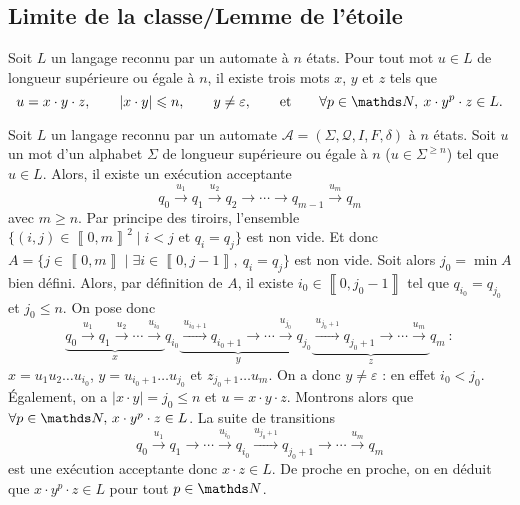 \subsection{Limite de la classe/Lemme de l'étoile}

\begin{thm}
	Soit $L$\/ un langage reconnu par un automate à $n$\/ états.
	Pour tout mot $u \in L$\/ de longueur supérieure ou égale à $n$, il existe trois mots $x$, $y$\/ et $z$\/ tels que \[
		u = x \cdot y \cdot z,\qquad|x\cdot y| \le n,\qquad y \neq \varepsilon, \qquad\text{et}\qquad \forall p \in \N,\:x\cdot y^p \cdot z \in L
	.\]
\end{thm}

\begin{prv}
	Soit $L$\/ un langage reconnu par un automate $\mathcal{A} = (\Sigma, \mathcal{Q}, I, F, \delta)$\/ à $n$\/ états. Soit $u$\/ un mot d'un alphabet $\Sigma$\/ de longueur supérieure ou égale à $n$\/ ($u \in \Sigma^{\ge n}$) tel que $u \in L$.
	Alors, il existe un exécution acceptante \[
		q_0 \xrightarrow{u_1} q_1 \xrightarrow{u_2} q_2 \to \cdots \to q_{m-1} \xrightarrow{u_m} q_m
	\] avec $m \ge n$.
	Par principe des tiroirs, l'ensemble $\{(i,j) \in \left\llbracket 0,m \right\rrbracket^2  \mid i < j \text{ et } q_i = q_j\}$\/ est non vide.
	Et donc $A = \{j \in \left\llbracket 0,m \right\rrbracket  \mid \exists i \in \left\llbracket 0,j-1 \right\rrbracket,\:q_i = q_j\}$\/ est non vide.
	Soit alors $j_0 = \min A$\/ bien défini. Alors, par définition de $A$, il existe $i_0 \in \left\llbracket 0,j_0-1 \right\rrbracket$\/ tel que $q_{i_0} = q_{j_0}$\/ et $j_0 \le n$. On pose donc \[
		\underbrace{q_0 \xrightarrow{u_1} q_1 \xrightarrow{u_2} \cdots \xrightarrow{u_{i_0}}}_x q_{i_0} \underbrace{\xrightarrow{u_{i_0+1}} q_{i_0 + 1} \to \cdots \xrightarrow{u_{j_0}}}_y q_{j_0} \underbrace{\xrightarrow{u_{j_0+1}} q_{j_0 + 1} \to \cdots \xrightarrow{u_m}}_z q_m\::
	\] $x = u_1u_2\ldots u_{i_0}$, $y = u_{i_0+1}\ldots u_{j_0}$\/ et $z_{j_0 + 1}\ldots u_m$.
	On a donc $y \neq \varepsilon$\/ : en effet $i_0 < j_0$.
	Également, on a $|x\cdot y| = j_0 \le n$\/ et $u = x\cdot y\cdot z$.
	Montrons alors que $\forall p \in \N,\,x \cdot y^p \cdot z \in L$.
	La suite de transitions \[
		q_0 \xrightarrow{u_1} q_1 \to \cdots \xrightarrow{u_{i_0}} q_{i_0} \xrightarrow{u_{j_0+1}}  q_{j_0+1} \to \cdots \xrightarrow{u_m} q_m
	\] est une exécution acceptante donc $x \cdot z \in L$. De proche en proche, on en déduit que $x \cdot y^p \cdot z \in L$\/ pour tout $p \in \N$.
\end{prv}

